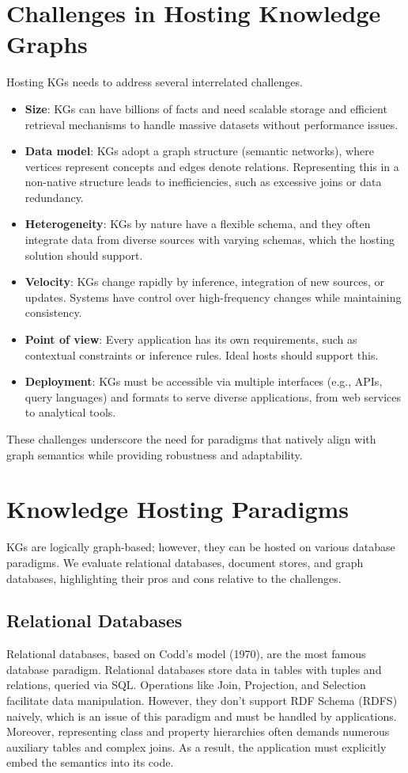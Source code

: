 \documentclass[12pt]{article}
\begin{document}
\section{Challenges in Hosting Knowledge Graphs}
Hosting KGs needs to address several interrelated challenges.
\begin{itemize}
    \item \textbf{Size}: KGs can have billions of facts and need scalable storage and efficient retrieval mechanisms to handle massive datasets without performance issues.
\item \textbf{Data model}: KGs adopt a graph structure (semantic networks), where vertices represent concepts and edges denote relations. Representing this in a non-native structure leads to inefficiencies, such as excessive joins or data redundancy.
\item \textbf{Heterogeneity}: KGs by nature have a flexible schema, and they often integrate data from diverse sources with varying schemas, which the hosting solution should support.
\item \textbf{Velocity}: KGs change rapidly by inference, integration of new sources, or updates. Systems have control over high-frequency changes while maintaining consistency.
\item \textbf{Point of view}: Every application has its own requirements, such as contextual constraints or inference rules. Ideal hosts should support this.
\item \textbf{Deployment}: KGs must be accessible via multiple interfaces (e.g., APIs, query languages) and formats to serve diverse applications, from web services to analytical tools.

\end{itemize}
These challenges underscore the need for paradigms that natively align with graph semantics while providing robustness and adaptability.
\section{Knowledge Hosting Paradigms}
KGs are logically graph-based; however, they can be hosted on various database paradigms. We evaluate relational databases, document stores, and graph databases, highlighting their pros and cons relative to the challenges.
\subsection{Relational Databases}
Relational databases, based on Codd's model (1970), are the most famous database paradigm. Relational databases store data in tables with tuples and relations, queried via SQL. Operations like Join, Projection, and Selection facilitate data manipulation. However, they don’t support RDF Schema (RDFS) naively, which is an issue of this paradigm and must be handled by applications. Moreover, representing class and property hierarchies often demands numerous auxiliary tables and complex joins. As a result, the application must explicitly embed the semantics into its code.
\end{document}
